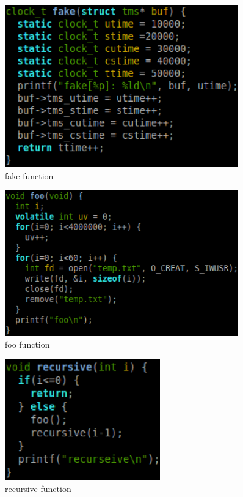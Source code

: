 \documentclass[11pt,letterpaper,oneside]{article}
\begin{document}
\begin{figure}
\begin{center}
\includegraphics[width=0.9\textwidth]{fig4.eps}
\caption{fake function}
\label{fig:fake}
\end{center}
\end{figure}
\begin{figure}
\begin{center}
\includegraphics[width=0.9\textwidth]{fig5.eps}
\caption{foo function}
\label{fig:foo}
\end{center}
\end{figure}
\begin{figure}
\begin{center}
\includegraphics[width=0.6\textwidth]{fig6.eps}
\caption{recursive function}
\label{fig:recursive}
\end{center}
\end{figure}
\end{document}
